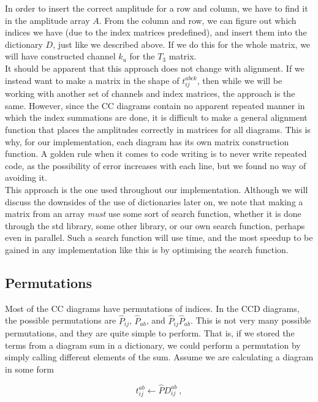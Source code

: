 	In order to insert the correct amplitude for a row and column, we have to find it in the amplitude array $A$. From the column and row, we can figure out which indices we have (due to the index matrices predefined), and insert them into the dictionary $D$, just like we described above. If we do this for the whole matrix, we will have constructed channel $k_u$ for the $T_3$ matrix.\\
	
	It should be apparent that this approach does not change with alignment. If we instead want to make a matrix in the shape of $t_{ij}^{abck}$, then while we will be working with another set of channels and index matrices, the approach is the same. However, since the CC diagrams contain no apparent repeated manner in which the index summations are done, it is difficult to make a general alignment function that places the amplitudes correctly in matrices for all diagrams. This is why, for our implementation, each diagram has its own matrix construction function. A golden rule when it comes to code writing is to never write repeated code, as the possibility of error increases with each line, but we found no way of avoiding it.\\
	
	This approach is the one used throughout our implementation. Although we will discuss the downsides of the use of dictionaries later on, we note that making a matrix from an array \emph{must} use some sort of search function, whether it is done through the std library, some other library, or our own search function, perhaps even in parallel. Such a search function will use time, and the most speedup to be gained in any implementation like this is by optimising the search function.
	
	\subsection{Permutations}
	\label{Implementation | sec | "permutations"}
	Most of the CC diagrams have permutations of indices. In the CCD diagrams, the possible permutations are $\hat{P}_{ij}$, $\hat{P}_{ab}$, and $\hat{P}_{ij}\hat{P}_{ab}$. This is not very many possible permutations, and they are quite simple to perform. That is, if we stored the terms from a diagram sum in a dictionary, we could perform a permutation by simply calling different elements of the sum. Assume we are calculating a diagram in some form
	
	\begin{equation}
		t_{ij}^{ab} \leftarrow \hat{P}D_{ij}^{ab}\:,
	\end{equation}
	
